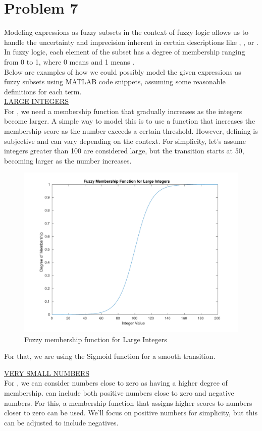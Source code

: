 \section{Problem 7}
Modeling expressions as fuzzy subsets in the context of fuzzy logic allows us to handle the uncertainty and imprecision inherent in certain descriptions like , , or . In fuzzy logic, each element of the subset has a degree of membership ranging from 0 to 1, where 0 means  and 1 means .\\
Below are examples of how we could possibly model the given expressions as fuzzy subsets using MATLAB code snippets, assuming some reasonable definitions for each term.\\

\underline{LARGE INTEGERS}\\
For , we need a membership function that gradually increases as the integers become larger. A simple way to model this is to use a function that increases the membership score as the number exceeds a certain threshold. However, defining  is subjective and can vary depending on the context. For simplicity, let's assume integers greater than 100 are considered large, but the transition starts at 50, becoming larger as the number increases.

\begin{figure}[H]
	\centering
	\includegraphics[width=0.46\linewidth]{../Problem 7/large_int.pdf}
	\caption{Fuzzy membership function for Large Integers}	
\end{figure}
For that, we are using the Sigmoid function for a smooth transition.
\vspace{5mm}

\underline{VERY SMALL NUMBERS}\\
For , we can consider numbers close to zero as having a higher degree of membership.  can include both positive numbers close to zero and negative numbers. For this, a membership function that assigns higher scores to numbers closer to zero can be used. We'll focus on positive numbers for simplicity, but this can be adjusted to include negatives.

